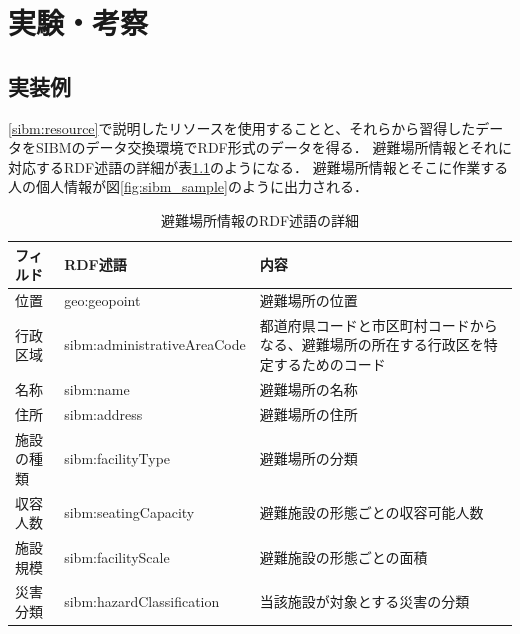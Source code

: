 ﻿%
\chapter{実験・考察}

\section{実装例}

\ref{sibm:resource}で説明したリソースを使用することと、それらから習得したデータをSIBMのデータ交換環境でRDF形式のデータを得る．
避難場所情報とそれに対応するRDF述語の詳細が表\ref{table:data_rdf_predicate}のようになる．
避難場所情報とそこに作業する人の個人情報が図\ref{fig:sibm_sample}のように出力される．

\begin{table}[h]
	\begin{center}
	\begin{tabular}{| l | l | p{48mm} |}
		\hline
		\rowstyle{\bfseries}
		フィルド & RDF述語 & 内容 \\
		\hline
		位置 & geo:geopoint & 避難場所の位置 \\
		\hline
		行政区域 & sibm:administrativeAreaCode &
		都道府県コードと市区町村コードからなる、避難場所の所在する行政区を特定するためのコード \\
		\hline
		名称 & sibm:name & 避難場所の名称 \\
		\hline
		住所 & sibm:address & 避難場所の住所 \\
		\hline
		施設の種類 & sibm:facilityType & 避難場所の分類 \\
		\hline
		収容人数 & sibm:seatingCapacity & 避難施設の形態ごとの収容可能人数 \\
		\hline
		施設規模 & sibm:facilityScale & 避難施設の形態ごとの面積 \\
		\hline
		災害分類 & sibm:hazardClassification & 当該施設が対象とする災害の分類 \\
		\hline
	\end{tabular}
	\caption{避難場所情報のRDF述語の詳細}
	\label{table:data_rdf_predicate}
	\end{center}
\end{table}
	
